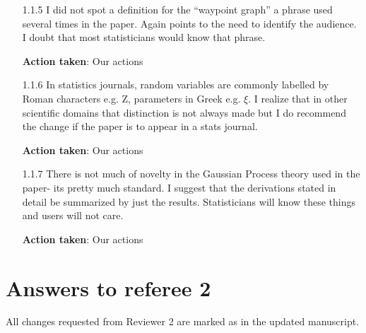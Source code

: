 \documentclass[a4paper]{article}
\newcounter{reviewer}
\def\action{\textbf{Action taken}}
\newcommand{\srevcomment}[1]{{\color{red}{\{Rev 2: #1\}}}}
\begin{document}
\begin{answers}
\begin{itemize}[noitemsep,topsep=0pt,parsep=0pt,partopsep=0pt]
\item[1.1.5] I did not spot a definition for the “waypoint graph” a phrase used several times in the paper. Again points to the need to identify the audience. I doubt that most statisticians would know that phrase.\par
\action: Our actions
\vspace{1em}

\item[1.1.6] In statistics journals, random variables are commonly labelled by Roman characters e.g. Z, parameters in Greek e.g. $\xi$. I realize that in other scientific domains that distinction is not always made but I do recommend the change if the paper is to appear in a stats journal.\par 
\action: Our actions
\vspace{1em}

\item[1.1.7] There is not much of novelty in the Gaussian Process theory used in the paper- its pretty much standard. I suggest that the derivations stated in detail be summarized by just the results. Statisticians will know these things and users will not care.\par
\action: Our actions
\vspace{1em}

\end{itemize}

\end{answers}

\section*{Answers to referee 2}
All changes requested from Reviewer 2 are marked as \srevcomment{red text}
in the updated manuscript.

\setcounter{reviewer}{2}
\end{document}
